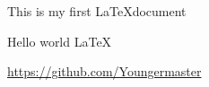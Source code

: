 \documentclass{article}
\begin{document}
This is my first \LaTeX \space document

Hello world \LaTeX

\url{https://github.com/Youngermaster}
\end{document}
